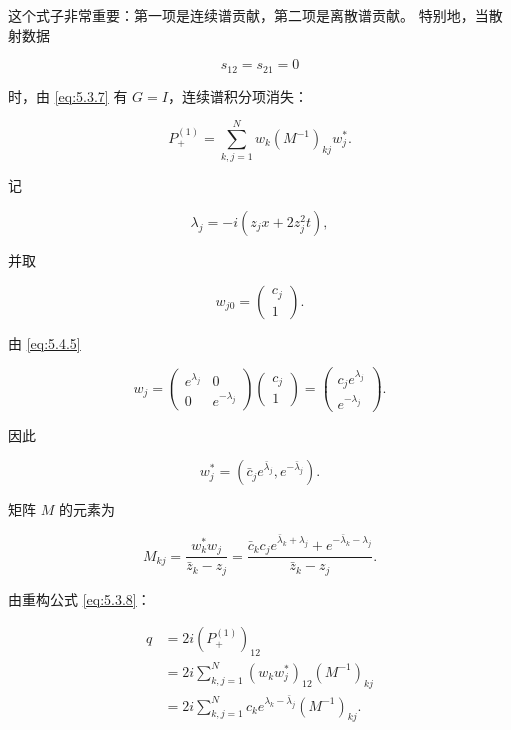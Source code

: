 \documentclass[
    lang=cn,
    scheme=chinese,
    mode=simple,
    device=normal,
    color=blue,
    math=cm,
    thmcnt=section,
    12pt,
    nowatermark
]{elegantbook}
\begin{document}
这个式子非常重要：第一项是连续谱贡献，第二项是离散谱贡献。
特别地，当散射数据

\[
    s_{12}=s_{21}=0
\]

时，由 \eqref{eq:5.3.7} 有 $G=I$，连续谱积分项消失：

\[
    P_+^{(1)}
    =
    \sum\limits_{k,j=1}^{N}
    w_k(M^{-1})_{kj}w_j^*.
\]

记

\[
    \lambda_j
    =
    -i(z_jx+2z_j^2t),
\]

并取

\[
    w_{j0}
    =
    \begin{pmatrix}
        c_j \\1
    \end{pmatrix}.
\]

由 \eqref{eq:5.4.5}

\begin{equation}
    w_j
    =
    \begin{pmatrix}
        e^{\lambda_j} & 0              \\
        0             & e^{-\lambda_j}
    \end{pmatrix}
    \begin{pmatrix}
        c_j \\1
    \end{pmatrix}
    =
    \begin{pmatrix}
        c_je^{\lambda_j} \\
        e^{-\lambda_j}
    \end{pmatrix}.
    \tag{5.4.10}
    \label{eq:5.4.10}
\end{equation}

因此

\begin{equation}
    w_j^*
    =
    \left(
    \bar c_je^{\bar\lambda_j},
    e^{-\bar\lambda_j}
    \right).
    \tag{5.4.11}
    \label{eq:5.4.11}
\end{equation}

矩阵 $M$ 的元素为

\begin{equation}
    M_{kj}
    =
    \dfrac{w_k^*w_j}{\bar z_k-z_j}
    =
    \dfrac{
        \bar c_kc_je^{\bar\lambda_k+\lambda_j}
        +
        e^{-\bar\lambda_k-\lambda_j}
    }{
        \bar z_k-z_j
    }.
    \tag{5.4.12}
    \label{eq:5.4.12}
\end{equation}

由重构公式 \eqref{eq:5.3.8}：

\begin{equation}
    \begin{aligned}
        q
         & =
        2i(P_+^{(1)})_{12}           \\
         & =
        2i
        \sum\limits_{k,j=1}^{N}
        (w_kw_j^*)_{12}(M^{-1})_{kj} \\
         & =
        2i
        \sum\limits_{k,j=1}^{N}
        c_ke^{\lambda_k-\bar\lambda_j}(M^{-1})_{kj}.
    \end{aligned}
    \tag{5.4.13}
    \label{eq:5.4.13}
\end{equation}
\end{document}
